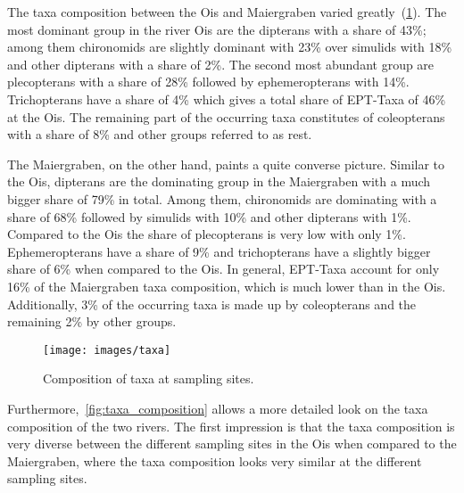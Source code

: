 
The taxa composition between the Ois and Maiergraben varied greatly~(\cref{fig:taxa}). The most dominant group in the river Ois are the dipterans with a share of 43\%; among them chironomids are slightly dominant with 23\% over simulids with 18\% and other dipterans with a share of 2\%. The second most abundant group are plecopterans with a share of 28\% followed by ephemeropterans with 14\%. Trichopterans have a share of 4\% which gives a total share of EPT-Taxa of 46\% at the Ois. The remaining part of the occurring taxa constitutes of coleopterans with a share of 8\% and other groups referred to as rest.

The Maiergraben, on the other hand, paints a quite converse picture. Similar to the Ois, dipterans are the dominating group in the Maiergraben with a much bigger share of 79\% in total. Among them, chironomids are dominating with a share of 68\% followed by simulids with 10\% and other dipterans with 1\%. Compared to the Ois the share of plecopterans is very low with only 1\%. Ephemeropterans have a share of 9\% and trichopterans have a slightly bigger share of 6\% when compared to the Ois. In general, EPT-Taxa account for only 16\% of the Maiergraben taxa composition, which is much lower than in the Ois. Additionally, 3\% of the occurring taxa is made up by coleopterans and the remaining 2\% by other groups.

\begin{figure}[!htb]                              %
  \center
  \texttt{[image: images/taxa]}                 %
  \caption{Composition of taxa at sampling sites.}                        %
  \label{fig:taxa}                                                        %
\end{figure}

Furthermore,~\cref{fig:taxa_composition} allows a more detailed look on the taxa composition of the two rivers. The first impression is that the taxa composition is very diverse between the different sampling sites in the Ois when compared to the Maiergraben, where the taxa composition looks very similar at the different sampling sites.

